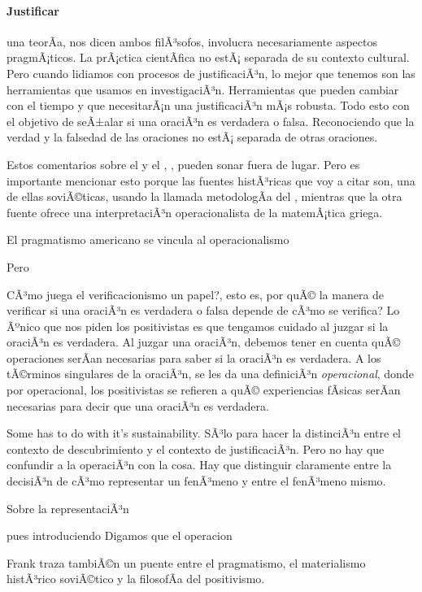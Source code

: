 \paragraph{Justificar} una teorÃ­a, nos dicen ambos filÃ³sofos, involucra necesariamente aspectos pragmÃ¡ticos.
La prÃ¡ctica cientÃ­fica no estÃ¡ separada de su contexto cultural.
Pero cuando lidiamos con procesos de justificaciÃ³n, lo mejor que tenemos son las herramientas que usamos en investigaciÃ³n.
Herramientas que pueden cambiar con el tiempo y que necesitarÃ¡n una justificaciÃ³n mÃ¡s robusta.
Todo esto con el objetivo de seÃ±alar si una oraciÃ³n es verdadera o falsa.
Reconociendo que la verdad y la falsedad de las oraciones no estÃ¡ separada de otras oraciones.

Estos comentarios sobre el  y el ,
, pueden sonar fuera de lugar.
Pero es importante mencionar esto porque las fuentes histÃ³ricas que voy a citar son, una de ellas soviÃ©ticas, usando la llamada metodologÃ­a del , mientras que la otra fuente ofrece una interpretaciÃ³n operacionalista de la matemÃ¡tica griega.

El pragmatismo americano se vincula al operacionalismo

Pero

CÃ³mo juega el verificacionismo un papel?, esto es, por quÃ© la manera de verificar si una oraciÃ³n es verdadera o falsa depende de cÃ³mo se verifica?
Lo Ãºnico que nos piden los positivistas es que tengamos cuidado al juzgar si la oraciÃ³n es verdadera.
Al juzgar una oraciÃ³n, debemos tener en cuenta quÃ© operaciones serÃ­an necesarias para saber si la oraciÃ³n es verdadera.
A los tÃ©rminos singulares de la oraciÃ³n, se les da una definiciÃ³n \emph{operacional}, donde por operacional, los positivistas se refieren a quÃ© experiencias fÃ­sicas serÃ­an necesarias para decir que una oraciÃ³n es verdadera.

Some has to do with it's sustainability.
SÃ³lo para hacer la distinciÃ³n entre el contexto de descubrimiento y el contexto de justificaciÃ³n.
Pero no hay que confundir a la operaciÃ³n con la cosa.
Hay que distinguir claramente entre la decisiÃ³n de cÃ³mo representar un fenÃ³meno y entre el fenÃ³meno mismo.

Sobre la representaciÃ³n

pues introduciendo
Digamos que el operacion

Frank traza tambiÃ©n un puente entre el pragmatismo, el materialismo histÃ³rico soviÃ©tico y la filosofÃ­a del positivismo.


